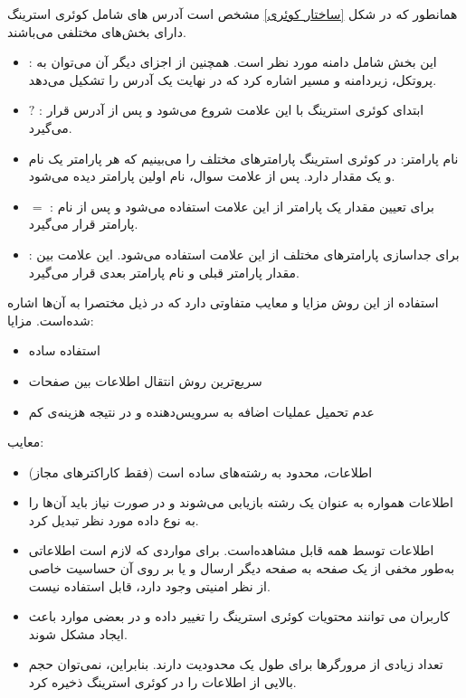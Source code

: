 همانطور که در شکل
\ref{ساختار کوئری}
مشخص است آدرس های شامل کوئری استرینگ دارای بخش‌های مختلفی می‌باشند.
\begin{itemize}
	\item 
	 : این بخش شامل دامنه مورد نظر است. همچنین از اجزای دیگر آن می‌توان به پروتکل، زیردامنه و مسیر اشاره کرد که در نهایت یک آدرس را تشکیل می‌دهد.
	\item
	$?$ : ابتدای کوئری استرینگ با این علامت شروع می‌شود و پس از آدرس قرار می‌گیرد.
	\item
	نام پارامتر: در کوئری استرینگ پارامترهای مختلف را می‌بینیم که هر پارامتر یک نام
	\noindent\unskip{}
	و یک مقدار
	\noindent\unskip{}
	دارد. پس از علامت سوال، نام اولین پارامتر دیده می‌شود.
	\item
	$=$ : برای تعیین مقدار یک پارامتر از این علامت استفاده می‌شود و پس از نام پارامتر قرار می‌گیرد.
	\item
	\lr{\&} : برای جداسازی پارامتر‌های مختلف از این علامت استفاده می‌شود. این علامت بین مقدار پارامتر قبلی و نام پارامتر بعدی قرار می‌گیرد.
\end{itemize}
استفاده از این روش مزایا و معایب متفاوتی دارد که در ذیل مختصرا به آن‌ها اشاره شده‌است.
\cite{QueryString}
مزایا:
\begin{itemize}
	
	\item
	استفاده ساده
	\item
	سریع‌ترین روش انتقال اطلاعات بين صفحات
	\item
	عدم تحميل عمليات اضافه به سرويس‌دهنده و در نتیجه هزینه‌ی کم
\end{itemize}

معایب:
\begin{itemize}
	
	\item
	اطلاعات، محدود به رشته‌های ساده است (فقط کاراکترهای مجاز)
	\item
	اطلاعات همواره به عنوان يک رشته بازيابی می‌شوند و در صورت نياز باید آن‌ها را به نوع داده مورد نظر تبديل كرد.
	\item
	اطلاعات توسط همه قابل مشاهده‌است. برای مواردی که لازم است اطلاعاتی به‌طور مخفی از يک صفحه به صفحه ديگر ارسال و يا بر روی آن حساسيت خاصی از نظر امنيتی وجود دارد، قابل استفاده نیست.
	\item
	كاربران می توانند محتويات کوئری استرینگ را تغيير داده و در بعضی موارد باعث ایجاد مشکل شوند.
	\item
	تعداد زيادی از مرورگرها برای طول یک
	محدودیت دارند. بنابراين، نمی‌توان حجم بالایی از اطلاعات را در کوئری استرینگ ذخيره كرد.
\end{itemize}
\newpage
